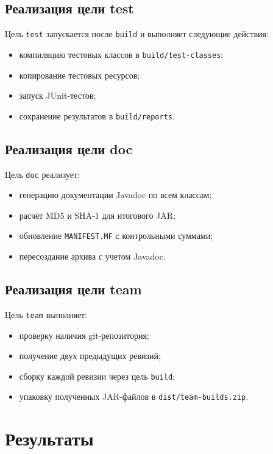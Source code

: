 \documentclass[12pt]{article}
\begin{document}
\subsection{Реализация цели test}

Цель \texttt{test} запускается после \texttt{build} и выполняет следующие действия:

\begin{itemize}[leftmargin=1.5em]
    \item компиляцию тестовых классов в \texttt{build/test-classes};
    \item копирование тестовых ресурсов;
    \item запуск JUnit-тестов;
    \item сохранение результатов в \texttt{build/reports}.
\end{itemize}

\subsection{Реализация цели doc}

Цель \texttt{doc} реализует:

\begin{itemize}[leftmargin=1.5em]
    \item генерацию документации Javadoc по всем классам;
    \item расчёт MD5 и SHA-1 для итогового JAR;
    \item обновление \texttt{MANIFEST.MF} с контрольными суммами;
    \item пересоздание архива с учетом Javadoc.
\end{itemize}

\subsection{Реализация цели team}

Цель \texttt{team} выполняет:

\begin{itemize}[leftmargin=1.5em]
    \item проверку наличия git-репозитория;
    \item получение двух предыдущих ревизий;
    \item сборку каждой ревизии через цель \texttt{build};
    \item упаковку полученных JAR-файлов в \texttt{dist/team-builds.zip}.
\end{itemize}

\section{Результаты}
\end{document}
